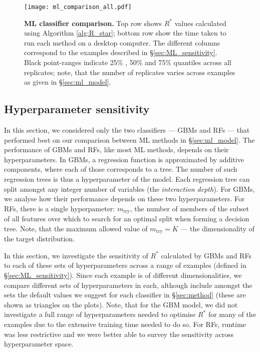 \documentclass{article}
\begin{document}
\begin{figure}[!htb]
	\centerline{\texttt{[image: ml\_comparison\_all.pdf]}}
	\caption{\textbf{ML classifier comparison.} Top row shows $R^*$ values calculated using Algorithm \ref{alg:R_star}; bottom row show the time taken to run each method on a desktop computer. The different columns correspond to the examples described in \S\ref{sec:ML_sensitivity}. Black point-ranges indicate 25\% , 50\% and 75\% quantiles across all replicates; note, that the number of replicates varies across examples as given in \S\ref{sec:ml_model}.}
	\label{fig:ml_comparison_all}
\end{figure}

\color{black}

\color{red}
\subsection{Hyperparameter sensitivity}\label{sec:hyperparameters}
In this section, we considered only the two classifiers — GBMs and RFs — that performed best on our comparison between ML methods in \S\ref{sec:ml_model}. The performance of GBMs and RFs, like most ML methods, depends on their hyperparameters. In GBMs, a regression function is approximated by additive components, where each of those corresponds to a tree. The number of such regression trees is thus a hyperparameter of the model. Each regression tree can split amongst any integer number of variables (the \textit{interaction depth}). For GBMs, we analyse how their performance depends on these two hyperparameters. For RFs, there is a single hyperpameter: $m_{\text{try}}$, the number of members of the subset of all features over which to search for an optimal split when forming a decision tree. Note, that the maximum allowed value of $m_{\text{try}}=K$ — the dimensionality of the target distribution. 

In this section, we investigate the sensitivity of $R^*$ calculated by GBMs and RFs to each of these sets of hyperparameters across a range of examples (defined in \S\ref{sec:ML_sensitivity}). Since each example is of different dimensionalities, we compare different sets of hyperparameters in each, although include amongst the sets the default values we suggest for each classifier in \S\ref{sec:method} (these are shown as triangles on the plots). Note, that for the GBM model, we did not investigate a full range of hyperparameters needed to optimise $R^*$ for many of the examples due to the extensive training time needed to do so. For RFs, runtime was less restrictive and we were better able to survey the sensitivity across hyperparameter space.
\end{document}
